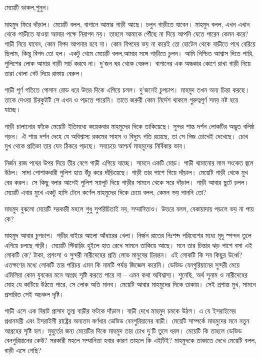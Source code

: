 \documentclass[
]{book}
\begin{document}
মেয়েটি ডাকল,শুনুন।

মাহমুদ ফিরে দাঁড়াল। মেয়েটি বলল, বাগানে আমার গাড়ী আছে। চলুন গাড়ীতে যাবেন। মাহমুদ বলল, এখন এখান থেকে গাড়ীতে যাওয়া আমার পক্ষে নিরাপদ নয়। তাহলে আমাকে পৌঁছে না দিয়ে আপনি যেতে পারেন কেমন করে? গাড়ী নিয়ে যাবেন, কোন বিপদ আপনার হবে না। কোন বিপদের ভয় না করেই তো হোটেল থেকে বাড়ীতে পথে বেরিয়ে ছিলাম, কিন্তু বিপদ তো হল। একটু থেমে মেয়েটি বলল,আমার সঙ্গে গাড়ীতে চুলন। আমি নিশ্চিত আশ্বাস দিতে পারি, পুলিশের লোক আমার গাড়ী সার্চ করবে না। দু'জন ঘর থেকে বেরুল। বাগানের এক অন্ধকার কোণে রাখা গাড়ী নিয়ে তারা খোলা গেট দিয়ে রাস্তায় বেরুল।

গাড়ী পূর্ণ গতিতে গোলান রোড ধরে উত্তর দিকে এগিয়ে চলল। দু'জনেই চুপচাপ। মাহমুদ তখন অন্য চিন্তা করছে। তাকে দেওয়া চিরকুটটি সে এখন ও পড়তে পারেনি। তাতে জরুরী কোন নির্দেশ থাকলে গুরুত্বপূর্ণ সময় নষ্ট হয়ে যাচ্ছে।

গাড়ী চালানোর ফাঁকে মেয়েটি ইতিমধ্যে কয়েকবার মাহমুদের দিকে তাকিয়েছে। সুন্দর শান্ত দর্শন লোকটির অদ্ভুত বলিষ্ঠ গড়ন। ঐ শান্ত দর্শন দেহে যে অবিশ্বাস্য রকমের সাহস ও বিদ্যুৎ গতি রয়েছে, তা সে নিজ চোখেই দেখেছে। চোখ মুখ থেকে প্রতিভা তার যেন ঠিকরে পড়ছে। সবচেয়ে আশ্চর্য মাহমুদের নির্বিকার ভাব।

নির্জন রাজ পথের উপর দিয়ে তীর বেগে গাড়ী এগিয়ে যাচ্ছে। সামনে একটি মোড়। গাড়ী থামানোর লাল সংকেত জ্বলে উঠল। সাদা পোশাকধারী পুলিশ হাত উঁচু করে দাঁড়িয়েছে। গাড়ী তার পাশে গিয়ে দাঁড়াল। মেয়েটি গাড়ী থেকে মুখ বের করল। সে কিছু বলার আগেই পুলিশ স্যালূট দিয়ে গাড়ীর সামনে থেকে সরে দাঁড়াল। গাড়ী আবার ছুটে চলল। মেয়েটি এবার মুখে একটু হাসি টেনে কর্ণেল মাহমুদের দিকে চেয়ে বলল, কেমন ভয় পাননি তো?

মাহমুদ বুঝলো মেয়েটি সরকারী মহলে শুধু সুপরিচিতাই নয়, সম্মানিতাও। উত্তরে বলল, বেকায়াদায় পড়লে ভয় না পায় কে?

মাহমুদ আবার চুপচাপ। গড়ীর বাইরে আলো আঁধারের খেলা। নির্জন রাতের নিঃশব্দ পরিবেশের মধ্যে মৃদু স্পন্দন তুলে এগিয়ে চলছে গাড়ী। মেয়েটি স্টিয়ারিং হুইলে হাত রেখে সামনে তাকিয়ে আছে। মনে তার চিন্তার ঝড় পাশে বসা এই লোকটি কে? টাকা, প্রশংসা ও সুন্দরী নারীদেহের প্রতি লোভ মানুষের চিরন্তন। এই লোকটি কি সব কিছুর উর্ধ্বে? এতক্ষণের মধ্যে লোকটি তার পরিচয় এমন কি নামটি পর্যন্ত জিজ্ঞেস করেনি। ডেভিড বেনগুরিয়ানের সুন্দরী মেয়ে এমিলিয়া কোন যুবকের মনে আগ্রহ সৃষ্টি করতে পারে না -- এমন কথা অবিশ্বাস্য। শুনেছি, অর্থ সুনাম ও নারীদেহের মোহ যে কাটিয়ে উঠতে পারে, সে লোক অতি মানব। মেয়েটি আবার মাহমুদের দিকে তাকায়। সেই প্রশান্ত মুখ, সামনে প্রসারিত সেই অচঞ্চল দৃষ্টি।

গাড়ী এসে এক বিরাট প্রাসাদ তুল্য বাড়ীর ফটকে দাঁড়াল। বাড়ী দেখে মাহমুদ চমকে উঠল। এ যে ইসরাইলের প্রধানমন্ত্রী এবং ইসরাইলী রাষ্ট্রের অন্যতম কর্ণধার ডেভিড বেনগুরিয়ানের বাড়ী। মেয়েটি সাম্পর্কে মাহমুদের মনে নতুন আগ্রহের সৃষ্টি হল। মুহুর্তের জন্য মেয়েটির দিকে মাহমুদ তার চোখ দু'টি তুলে ধরল। মেয়েটি কি তাহলে ডেভিড বেনগুরিয়ানের কেউ? সরকারী মহলে সম্মানিতা হবার কারণ তাহলে কি এইটিই? মাহমুদকে তাকাতে দেখে মেয়েটি বলল, বাড়ী এসে গেছি?
\end{document}
